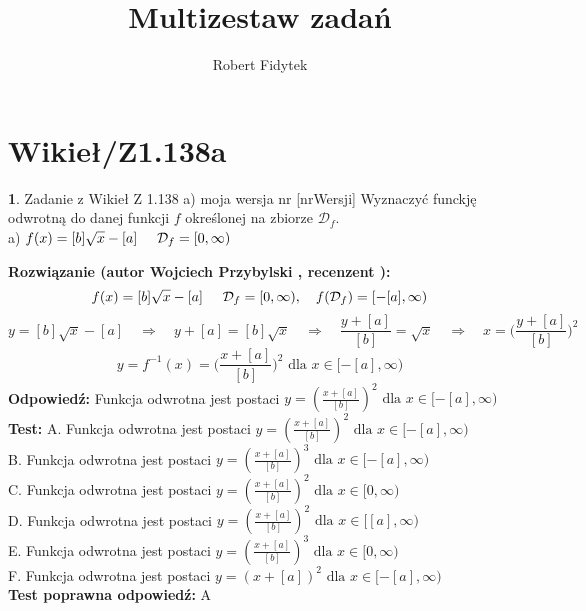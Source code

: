 \documentclass[12pt, a4paper]{article}
\title{Multizestaw zadań}
\author{Robert Fidytek}
\date{}
\theoremstyle{definition} %
\newtheorem{zad}{}
\newcommand{\kategoria}[1]{\section{#1}} %
\newcommand{\zadStart}[1]{\begin{zad}#1\newline} %
\newcommand{\zadStop}{\end{zad}}   %
\newcommand{\rozwStart}[2]{\noindent \textbf{Rozwiązanie (autor #1 , recenzent #2): }\newline} %
\newcommand{\rozwStop}{\newline}                                            %
\newcommand{\odpStart}{\noindent \textbf{Odpowiedź:}\newline}    %
\newcommand{\odpStop}{\newline}                                             %
\newcommand{\testStart}{\noindent \textbf{Test:}\newline} %
\newcommand{\testStop}{\newline} %
\newcommand{\kluczStart}{\noindent \textbf{Test poprawna odpowiedź:}\newline} %
\newcommand{\kluczStop}{\newline} %
\begin{document}
\maketitle


\kategoria{Wikieł/Z1.138a}
\zadStart{Zadanie z Wikieł Z 1.138 a) moja wersja nr [nrWersji]}
Wyznaczyć funckję odwrotną do danej funkcji $f$ określonej na zbiorze $\mathcal{D}_{f}$.\\
a) $f(x)=[b]\sqrt{x}-[a]\hspace{5mm}\mathcal{D}_{f}=[0,\infty)$
\zadStop
\rozwStart{Wojciech Przybylski}{}
$$f(x)=[b]\sqrt{x}-[a]\hspace{5mm} \mathcal{D}_{f}=[0,\infty), \quad  f(\mathcal{D}_{f})=[-[a],\infty)$$
$$y=[b]\sqrt{x}-[a] \quad \Rightarrow \quad y+[a]=[b]\sqrt{x} \quad \Rightarrow \quad \frac{y+[a]}{[b]}=\sqrt{x} \quad \Rightarrow \quad x=\Big(\frac{y+[a]}{[b]}\Big)^{2}$$
$$y=f^{-1}(x)=\Big(\frac{x+[a]}{[b]}\Big)^{2} \mbox{ dla }x\in[-[a],\infty) $$
\rozwStop
\odpStart
Funkcja odwrotna jest postaci $y=(\frac{x+[a]}{[b]})^{2} \mbox{ dla }x\in[-[a],\infty)$
\odpStop
\testStart
A. Funkcja odwrotna jest postaci $y=(\frac{x+[a]}{[b]})^{2} \mbox{ dla }x\in[-[a],\infty)$\\
B. Funkcja odwrotna jest postaci $y=(\frac{x+[a]}{[b]})^{3} \mbox{ dla }x\in[-[a],\infty)$\\
C. Funkcja odwrotna jest postaci $y=(\frac{x+[a]}{[b]})^{2} \mbox{ dla }x\in[0,\infty)$\\
D. Funkcja odwrotna jest postaci $y=(\frac{x+[a]}{[b]})^{2} \mbox{ dla }x\in[[a],\infty)$\\
E. Funkcja odwrotna jest postaci $y=(\frac{x+[a]}{[b]})^{3} \mbox{ dla }x\in[0,\infty)$\\
F. Funkcja odwrotna jest postaci $y=(x+[a])^{2} \mbox{ dla }x\in[-[a],\infty)$\\
\testStop
\kluczStart
A
\kluczStop
\end{document}
